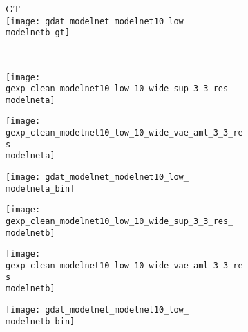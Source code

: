\begin{figure}[t!]
{\begin{subfigure}[t]{0.07\textwidth}
    \end{subfigure}
    \begin{subfigure}[t]{0.07\textwidth}
        \vspace{0px}\centering
        GT\\
        \texttt{[image: gdat\_modelnet\_modelnet10\_low\_\\modelnetb\_gt]}
    \end{subfigure}
    \\[-4px]
    \begin{subfigure}[t]{0.07\textwidth}
        \vspace{0px}\centering
        \texttt{[image: gexp\_clean\_modelnet10\_low\_10\_wide\_sup\_3\_3\_res\_\\modelneta]}
    \end{subfigure}
    \begin{subfigure}[t]{0.07\textwidth}
        \vspace{0px}\centering
        \texttt{[image: gexp\_clean\_modelnet10\_low\_10\_wide\_vae\_aml\_3\_3\_res\_\\modelneta]}
    \end{subfigure}
    \begin{subfigure}[t]{0.07\textwidth}
        \vspace{0px}\centering
        \texttt{[image: gdat\_modelnet\_modelnet10\_low\_\\modelneta\_bin]}
    \end{subfigure}
    \begin{subfigure}[t]{0.07\textwidth}
        \vspace{0px}\centering
        \texttt{[image: gexp\_clean\_modelnet10\_low\_10\_wide\_sup\_3\_3\_res\_\\modelnetb]}
    \end{subfigure}
    \begin{subfigure}[t]{0.07\textwidth}
        \vspace{0px}\centering
        \texttt{[image: gexp\_clean\_modelnet10\_low\_10\_wide\_vae\_aml\_3\_3\_res\_\\modelnetb]}
    \end{subfigure}
    \begin{subfigure}[t]{0.07\textwidth}
        \vspace{0px}\centering
        \texttt{[image: gdat\_modelnet\_modelnet10\_low\_\\modelnetb\_bin]}

\end{subfigure}}
\end{figure}
